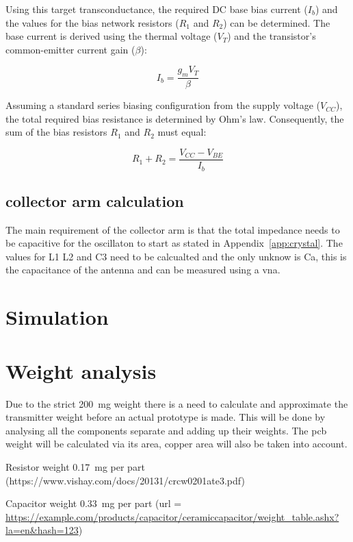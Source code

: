 Using this target transconductance, the required DC base bias current ($I_b$) and the values for the bias network resistors ($R_1$ and $R_2$) can be determined. The base current is derived using the thermal voltage ($V_T$) and the transistor's common-emitter current gain ($\beta$):

\begin{equation}
	I_b = \frac{g_m V_T}{\beta}
\end{equation}

Assuming a standard series biasing configuration from the supply voltage ($V_{CC}$), the total required bias resistance is determined by Ohm's law. Consequently, the sum of the bias resistors $R_1$ and $R_2$ must equal:

\begin{equation}
	R_1 + R_2 = \frac{V_{CC} - V_{BE}}{I_b}
\end{equation}

\subsection{collector arm calculation}

The main requirement of the collector arm is that the total impedance needs to be capacitive for the oscillaton to start as stated in Appendix~\ref{app:crystal}. The values for L1 L2 and C3 need to be calcualted and the only unknow is Ca, this is the capacitance of the antenna and can be measured using a \gls{vna}.



\section{Simulation}

\section{Weight analysis}

Due to the strict 200~mg weight there is a need to calculate and approximate the transmitter weight before an actual prototype is made. This will be done by analysing all the components separate and adding up their weights.
The pcb weight will be calculated via its area, copper area will also be taken into account.

Resistor weight 0.17~mg per part 
(https://www.vishay.com/docs/20131/crcw0201ate3.pdf)

Capacitor weight 0.33~mg per part 
(url = {\url{https://example.com/products/capacitor/ceramiccapacitor/weight_table.ashx?la=en&hash=123}})

